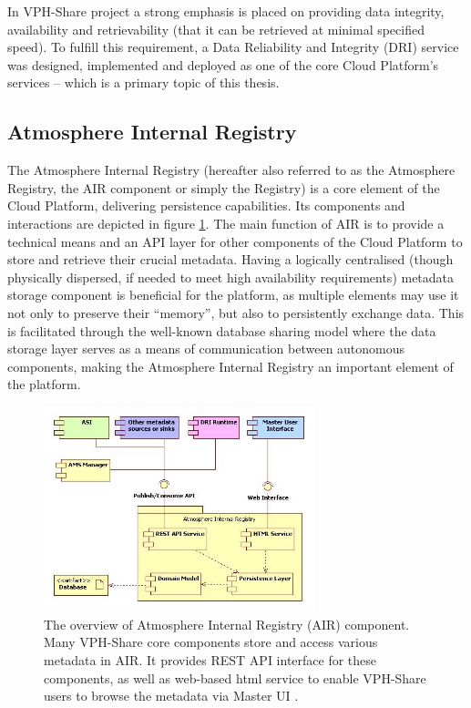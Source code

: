 In VPH-Share project a strong emphasis is placed on providing data integrity,
availability and retrievability (that it can be retrieved at minimal specified
speed). To fulfill this requirement, a Data Reliability and Integrity (DRI)
service was designed, implemented and deployed as one of the core Cloud
Platform's services -- which is a primary topic of this thesis.\\

\subsection{Atmosphere Internal Registry}
\label{air}
The Atmosphere Internal Registry (hereafter also referred to as the Atmosphere
Registry, the AIR component or simply the Registry) is a core element of the 
Cloud Platform, delivering persistence capabilities. Its components and
interactions are depicted in figure \ref{fig:air-architecture}. The main 
function of AIR is to provide a technical means and an API layer for other 
components of the Cloud Platform to store and retrieve their crucial metadata. Having 
a logically centralised (though physically dispersed, if needed to meet high
availability requirements) metadata storage component is beneficial for the 
platform, as multiple elements may use it not only to preserve their “memory”,
but also to persistently exchange data. 
This is facilitated through the well-known database sharing 
model where the data storage layer serves as a means of communication between
autonomous components, making the Atmosphere Internal Registry an important 
element of the platform.

\begin{figure}[h!]
	\centering
	\includegraphics[width=0.7\textwidth]{images/air-architecture.png}
	\caption{The overview of Atmosphere Internal Registry (AIR) component.
	Many VPH-Share core components store and access various metadata in AIR.
	It provides REST API interface for these components, as well as web-based
	html service to enable VPH-Share users to browse the metadata via Master UI
	\cite{vph-deliverable-2-2}.}
	\label{fig:air-architecture}
\end{figure}

